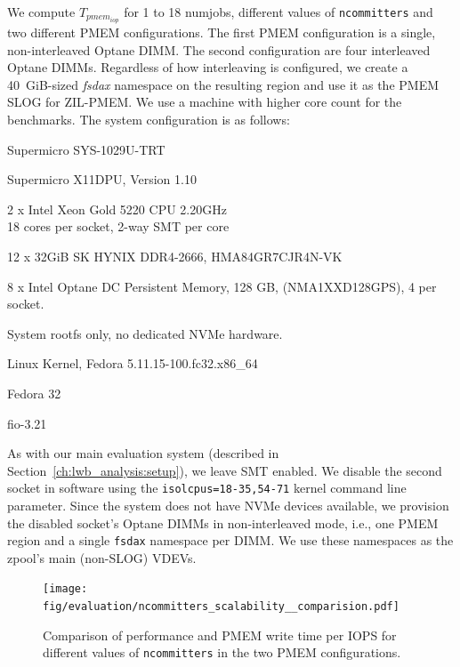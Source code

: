 \documentclass[12pt,a4paper,twoside]{book}
\begin{document}
We compute $T_{pmem_{iop}}$ for 1 to 18 numjobs, different values of \lstinline{ncommitters} and two different PMEM configurations.
The first PMEM configuration is a single, non-interleaved Optane DIMM.
The second configuration are four interleaved Optane DIMMs.
Regardless of how interleaving is configured, we create a 40~GiB-sized \textit{fsdax} namespace on the resulting region and use it as the PMEM SLOG for ZIL-PMEM.
We use a machine with higher core count for the benchmarks.
The system configuration is as follows:
\begin{description}[noitemsep,leftmargin=1.5cm,labelindent=1cm]
    \item[System] Supermicro SYS-1029U-TRT
    \item[Mainboard] Supermicro X11DPU, Version 1.10
    \item[CPU] 2 x Intel Xeon Gold 5220 CPU \@ 2.20GHz \\
        18 cores per socket, 2-way SMT per core
    \item[DRAM] 12 x 32GiB SK HYNIX DDR4-2666, HMA84GR7CJR4N-VK  %
    \item[PMEM] 8 x Intel Optane DC Persistent Memory, 128 GB, (NMA1XXD128GPS), 4 per socket.
    \item[NVMe] System rootfs only, no dedicated NVMe hardware.
    \item[Kernel] Linux Kernel, Fedora 5.11.15-100.fc32.x86\_64
    \item[Userland] Fedora 32
    \item[fio] fio-3.21
\end{description}
As with our main evaluation system (described in Section~\ref{ch:lwb_analysis:setup}), we leave SMT enabled.
We disable the second socket in software using the \lstinline{isolcpus=18-35,54-71} kernel command line parameter.
Since the system does not have NVMe devices available, we provision the disabled socket's Optane DIMMs in non-interleaved mode, i.e., one PMEM region and a single \lstinline{fsdax} namespace per DIMM.
We use these namespaces as the zpool's main (non-SLOG) VDEVs.

\begin{figure}
    \centering
    \texttt{[image: fig/evaluation/ncommitters\_scalability\_\_comparision.pdf]}
    \caption{Comparison of performance and PMEM write time per IOPS for different values of \lstinline{ncommitters} in the two PMEM configurations.}
    \label{fig:eval:ncommitters_scalability:main}
\end{figure}
\end{document}
